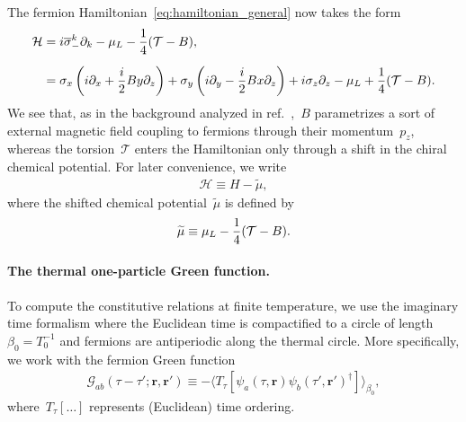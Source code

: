 \documentclass[11pt,a4paper]{article}
\begin{document}
The fermion Hamiltonian~\eqref{eq:hamiltonian_general} now takes the form
\begin{align}
\mathcal{H}&=i\overline{\sigma}^{k}_{-}\partial_{k}-\mu_{L}-{1\over 4}(\mathcal{T}-B), 
\nonumber\\[0.2cm]
&=\sigma_{x}\left(i\partial_{x}+{i\over 2}By\partial_{z}\right)
+\sigma_{y}\left(i\partial_{y}-{i\over 2}Bx\partial_{z}\right)
+i\sigma_{z}\partial_{z}
-\mu_{L}+{1\over 4}(\mathcal{T}-B).
\label{eq:hamiltonian_stone}
\end{align}
We see that, as in the background analyzed in ref.~\cite{Huang:2019haq},~$B$ parametrizes a sort of external magnetic field coupling to
fermions through their momentum~$p_{z}$, whereas
the torsion~$\mathcal{T}$ enters the Hamiltonian only through a shift in the chiral chemical
potential. For later convenience, we write
\begin{align}
\mathcal{H}\equiv H-\widetilde{\mu},
\label{eq:H_oper}
\end{align}
where the shifted chemical potential~$\widetilde{\mu}$ is defined by
\begin{align}
\widetilde{\mu}\equiv \mu_{L}-{1\over 4}(\mathcal{T}-B).
\label{eq:mutilde_def}
\end{align}


\paragraph{The thermal one-particle Green function.}
To compute the constitutive relations at finite temperature,
we use the imaginary time formalism where the Euclidean time is
compactified to a circle of length~$\beta_{0}=T_{0}^{-1}$ and fermions 
are antiperiodic along the thermal circle. 
More specifically, we work with the fermion Green function
\begin{align}
\mathcal{G}_{ab}(\tau-\tau';\boldsymbol{r},\boldsymbol{r}')\equiv -\langle 
T_{\tau}[\psi_{a}(\tau,\boldsymbol{r})
\psi_{b}(\tau',\boldsymbol{r}')^{\dagger}]\rangle_{\beta_{0}},
\end{align}
where~$T_{\tau}[\ldots]$ 
represents (Euclidean) time ordering. 
\end{document}
